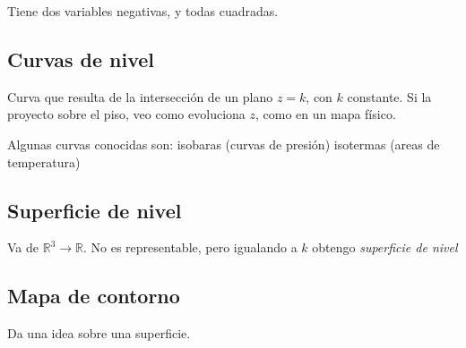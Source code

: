 Tiene dos variables negativas, y todas cuadradas.


\subsection{Curvas de nivel}

Curva que resulta de la intersección de un plano \(z=k\),
con \(k\) constante.
Si la proyecto sobre el piso, veo como evoluciona \(z\),
como en un mapa físico.

Algunas curvas conocidas son: isobaras (curvas de presión)
isotermas (areas de temperatura)

\subsection{Superficie de nivel}

Va de \(\mathbb{R}^{3} \to \mathbb{R}\). No es representable,
pero igualando a \(k\) obtengo \textit{superficie de nivel}

\subsection{Mapa de contorno}

Da una idea sobre una superficie.